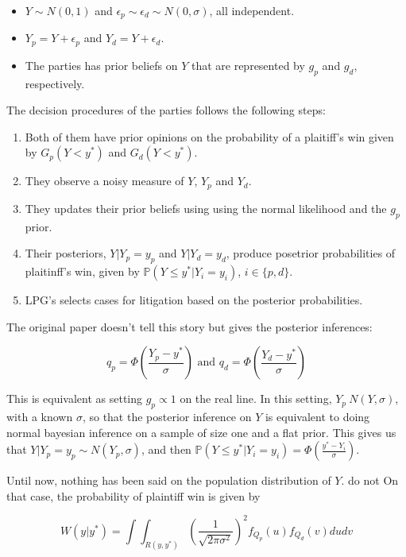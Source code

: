 \documentclass[]{report}
\providecommand{\tightlist}{%
  \setlength{\itemsep}{0pt}\setlength{\parskip}{0pt}}
\theoremstyle{definition}
\theoremstyle{definition}
\theoremstyle{definition}
\theoremstyle{remark}
\begin{document}
\begin{itemize}
\tightlist
\item
  \(Y \sim N(0,1)\) and \(\epsilon_p \sim \epsilon_d \sim N(0,\sigma)\),
  all independent.
\item
  \(Y_p = Y + \epsilon_p\) and \(Y_d = Y + \epsilon_d\).
\item
  The parties has prior beliefs on \(Y\) that are represented by \(g_p\)
  and \(g_d\), respectively.
\end{itemize}

The decision procedures of the parties follows the following steps:

\begin{enumerate}
\def\labelenumi{\arabic{enumi}.}
\tightlist
\item
  Both of them have prior opinions on the probability of a plaitiff's
  win given by \(G_p(Y < y^*)\) and \(G_d(Y < y^*)\).
\item
  They observe a noisy measure of \(Y\), \(Y_p\) and \(Y_d\).
\item
  They updates their prior beliefs using using the normal likelihood and
  the \(g_p\) prior.
\item
  Their posteriors, \(Y|Y_p = y_p\) and \(Y|Y_d=y_d\), produce posetrior
  probabilities of plaitinff's win, given by
  \(\mathbb{P}(Y \leq y^*|Y_i = y_i)\), \(i \in \{p,d\}\).
\item
  LPG's selects cases for litigation based on the posterior
  probabilities.
\end{enumerate}

The original paper doesn't tell this story but gives the posterior
inferences:

\[ q_p = \Phi\left(\frac{Y_p - y^*}{\sigma}\right) \text{ and }q_d = \Phi\left(\frac{Y_d-y^*}{\sigma}\right)\]

This is equivalent as setting \(g_p \propto 1\) on the real line. In
this setting, \(Y_p ~ N(Y, \sigma)\), with a known \(\sigma\), so that
the posterior inference on \(Y\) is equivalent to doing normal bayesian
inference on a sample of size one and a flat prior. This gives us that
\(Y|Y_p=y_p \sim N(Y_p, \sigma)\), and then
\(\mathbb{P}(Y \leq y^*|Y_i = y_i) = \Phi\left(\frac{y^*-Y_i}{\sigma}\right)\).

Until now, nothing has been said on the population distribution of
\(Y\). \citep{priest1984selection} do not On that case, the probability
of plaintiff win is given by

\[W(y|y^*) = \int \int_{R(y,y^*)}\left(\frac{1}{\sqrt{2\pi\sigma^2}}\right)^2f_{Q_p}(u)f_{Q_d}(v)dudv\]
\end{document}
